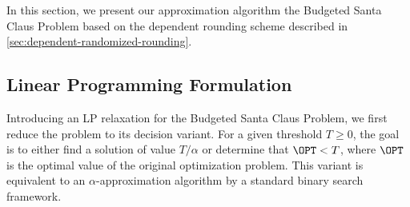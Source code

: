 \documentclass[a4paper,USenglish,cleveref,thm-restate]{lipics-v2021}
\begin{document}
In this section, we present our approximation algorithm the Budgeted Santa Claus Problem based on the dependent rounding scheme described in \cref{sec:dependent-randomized-rounding}.

\subsection{Linear Programming Formulation}
\label{subsec:lp}
Introducing an LP relaxation for the Budgeted Santa Claus Problem,  we first reduce the problem to its decision variant.
For a given threshold $T \ge 0$, the goal is to either
find a solution of value $T/ \alpha$ or determine that
$\OPT < T$, where $\OPT$ is the optimal value of the original optimization problem. This variant is equivalent to an
$\alpha$-approximation algorithm by a standard
binary search framework. 
\end{document}
